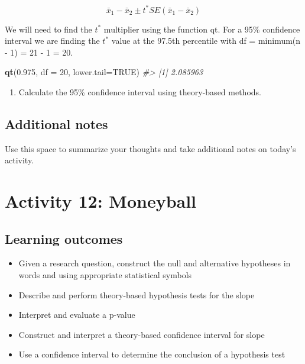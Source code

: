 \documentclass[
]{report}
\newenvironment{Shaded}{\begin{snugshade}}{\end{snugshade}}
\newcommand{\CommentTok}[1]{\textcolor[rgb]{0.56,0.35,0.01}{\textit{#1}}}
\newcommand{\DataTypeTok}[1]{\textcolor[rgb]{0.13,0.29,0.53}{#1}}
\newcommand{\DecValTok}[1]{\textcolor[rgb]{0.00,0.00,0.81}{#1}}
\newcommand{\FloatTok}[1]{\textcolor[rgb]{0.00,0.00,0.81}{#1}}
\newcommand{\KeywordTok}[1]{\textcolor[rgb]{0.13,0.29,0.53}{\textbf{#1}}}
\newcommand{\NormalTok}[1]{#1}
\newcommand{\OtherTok}[1]{\textcolor[rgb]{0.56,0.35,0.01}{#1}}
\providecommand{\tightlist}{%
  \setlength{\itemsep}{0pt}\setlength{\parskip}{0pt}}
\begin{document}
\[\bar{x}_1- \bar{x}_2\pm t^* SE(\bar{x}_1- \bar{x}_2)\]

We will need to find the \(t^*\) multiplier using the function qt. For a 95\% confidence interval we are finding the \(t^*\) value at the 97.5th percentile with df = minimum(n - 1) = 21 - 1 = 20.

\begin{Shaded}
\begin{Highlighting}[]
\KeywordTok{qt}\NormalTok{(}\FloatTok{0.975}\NormalTok{, }\DataTypeTok{df =} \DecValTok{20}\NormalTok{, }\DataTypeTok{lower.tail=}\OtherTok{TRUE}\NormalTok{)}
\CommentTok{\#\textgreater{} [1] 2.085963}
\end{Highlighting}
\end{Shaded}

\begin{enumerate}
\def\labelenumi{\arabic{enumi}.}
\setcounter{enumi}{6}
\tightlist
\item
  Calculate the 95\% confidence interval using theory-based methods.
\end{enumerate}

\vspace{1in}

\newpage

\hypertarget{additional-notes}{%
\section{Additional notes}\label{additional-notes}}

Use this space to summarize your thoughts and take additional notes on today's activity.

\hypertarget{activity-12-moneyball}{%
\chapter{Activity 12: Moneyball}\label{activity-12-moneyball}}

\hypertarget{learning-outcomes}{%
\section{Learning outcomes}\label{learning-outcomes}}

\begin{itemize}
\item
  Given a research question, construct the null and alternative hypotheses
  in words and using appropriate statistical symbols
\item
  Describe and perform theory-based hypothesis tests for the slope
\item
  Interpret and evaluate a p-value
\item
  Construct and interpret a theory-based confidence interval for slope
\item
  Use a confidence interval to determine the conclusion of a hypothesis test
\end{itemize}
\end{document}
